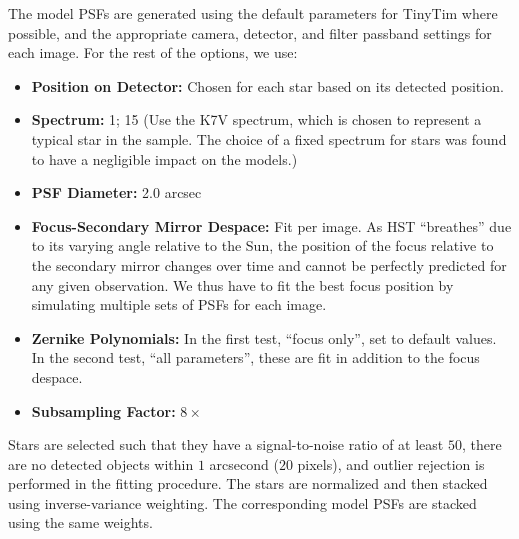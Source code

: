 \documentclass[useAMS,usenatbib]{mn2e}
\begin{document}
The model PSFs are generated using the default parameters for TinyTim
where possible, and the appropriate camera, detector, and filter
passband settings for each image. For the rest of the options, we use:
\begin{itemize}
  \item \textbf{Position on Detector:} Chosen for each star based on its
detected position.
  \item \textbf{Spectrum:} 1; 15 (Use the K7V spectrum, which is chosen
to represent a typical star in the sample. The choice of a fixed
spectrum for stars was found to have a negligible impact on the
models.)
  \item \textbf{PSF Diameter:} 2.0 arcsec
  \item \textbf{Focus-Secondary Mirror Despace:} Fit per image. As HST
    ``breathes'' due to its varying angle relative to the Sun, the
    position of the focus relative to the secondary mirror changes
    over time and cannot be perfectly predicted for any given
    observation. We thus have to fit the best focus position by
    simulating multiple sets of PSFs for each image.
  \item \textbf{Zernike Polynomials:} In the first test, ``focus
    only'', set to default values. In the second test, ``all
    parameters'', these are fit in addition to the focus despace.
  \item \textbf{Subsampling Factor:} $8\times$
\end{itemize}

Stars are selected such that they have a signal-to-noise ratio of at
least $50$, there are no detected objects within $1$ arcsecond ($20$
pixels), and outlier rejection is performed in the fitting procedure.
The stars are normalized and then stacked using inverse-variance
weighting. The corresponding model PSFs are stacked using the same
weights.
\end{document}
